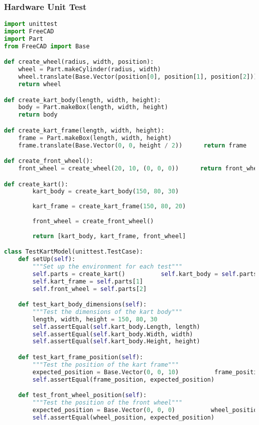 \documentclass[a4paper,12pt]{report}
\begin{document}
\subsubsection{Hardware Unit Test}
\begin{lstlisting}[language=Python]
import unittest
import FreeCAD
import Part
from FreeCAD import Base

def create_wheel(radius, width, position):
    wheel = Part.makeCylinder(radius, width)
    wheel.translate(Base.Vector(position[0], position[1], position[2]))
    return wheel

def create_kart_body(length, width, height):
    body = Part.makeBox(length, width, height)
    return body

def create_kart_frame(length, width, height):
    frame = Part.makeBox(length, width, height)
    frame.translate(Base.Vector(0, 0, height / 2))      return frame

def create_front_wheel():
    front_wheel = create_wheel(20, 10, (0, 0, 0))      return front_wheel

def create_kart():
        kart_body = create_kart_body(150, 80, 30)
    
        kart_frame = create_kart_frame(150, 80, 20)
    
        front_wheel = create_front_wheel()
    
        return [kart_body, kart_frame, front_wheel]

class TestKartModel(unittest.TestCase):
    def setUp(self):
        """Set up the environment for each test"""
        self.parts = create_kart()          self.kart_body = self.parts[0]
        self.kart_frame = self.parts[1]
        self.front_wheel = self.parts[2]

    def test_kart_body_dimensions(self):
        """Test the dimensions of the kart body"""
        length, width, height = 150, 80, 30
        self.assertEqual(self.kart_body.Length, length)
        self.assertEqual(self.kart_body.Width, width)
        self.assertEqual(self.kart_body.Height, height)

    def test_kart_frame_position(self):
        """Test the position of the kart frame"""
        expected_position = Base.Vector(0, 0, 10)          frame_position = self.kart_frame.CenterOfMass
        self.assertEqual(frame_position, expected_position)

    def test_front_wheel_position(self):
        """Test the position of the front wheel"""
        expected_position = Base.Vector(0, 0, 0)          wheel_position = self.front_wheel.CenterOfMass
        self.assertEqual(wheel_position, expected_position)


\end{lstlisting}
\end{document}
